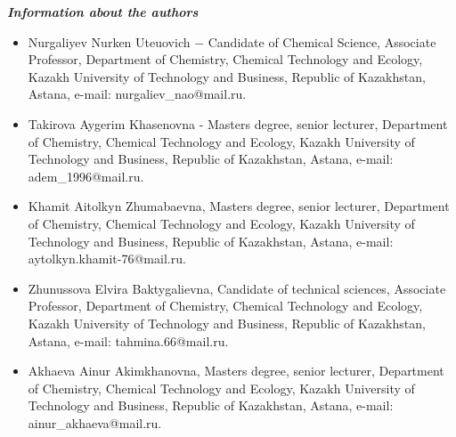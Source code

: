 \emph{{\bfseries Information about the authors}}

\begin{itemize}
\item
Nurgaliyev Nurken Uteuovich − Candidate of Chemical Science, Associate
Professor, Department of Chemistry, Chemical Technology and Ecology,
Kazakh University of Technology and Business, Republic of Kazakhstan,
Astana, e-mail:
nurgaliev\_nao@mail.ru.

\item
Takirova Aygerim Khasenovna - Master\textquotesingle s degree, senior
lecturer, Department of Chemistry, Chemical Technology and Ecology,
Kazakh University of Technology and Business, Republic of Kazakhstan,
Astana, e-mail:
adem\_1996@mail.ru.

\item
Khamit Aitolkyn Zhumabaevna, Master\textquotesingle s degree, senior
lecturer, Department of Chemistry, Chemical Technology and Ecology,
Kazakh University of Technology and Business, Republic of Kazakhstan,
Astana, e-mail:
aytolkyn.khamit-76@mail.ru.

\item
Zhunussova Elvira Baktygalievna, Candidate of technical sciences,
Associate Professor, Department of Chemistry, Chemical Technology and
Ecology, Kazakh University of Technology and Business, Republic of
Kazakhstan, Astana, e-mail:
tahmina.66@mail.ru.

\item
Akhaeva Ainur Akimkhanovna, Master\textquotesingle s degree, senior
lecturer, Department of Chemistry, Chemical Technology and Ecology,
Kazakh University of Technology and Business, Republic of Kazakhstan,
Astana, e-mail: ainur\_akhaeva@mail.ru.
\end{itemize}
